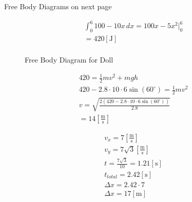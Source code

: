 \documentclass[12pt]{article}
\begin{document}
\begin{center}
  Free Body Diagrams on next page
\end{center}

\begin{equation}
  \begin{split}
    \int_0^6 100-10x\,dx=100x-5x^2\Big|_0^6\\
    =420[\si{\joule}]\\
  \end{split}
  \label{15}
\end{equation}

    \begin{figure}[H]
      \centering
      
      \caption{Free Body Diagram for Doll}
      \label{fig:4}
    \end{figure}

    \begin{equation}
      \begin{split}
        420=\frac{1}{2}mv^2+mgh\\
        420-2.8\cdot10\cdot6\sin(60^{\circ})=\frac{1}{2}mv^2\\
        v=\sqrt{\frac{2(420-2.8\cdot10\cdot6\sin(60^{\circ}))}{2.8}}\\
        =14\left[ \frac{\si{\meter}}{\si{\second}} \right]
      \end{split}
      \label{16}
    \end{equation}

    \begin{equation}
      \begin{split}
        v_x=7\left[ \frac{\si{\meter}}{\si{\second}} \right]\\
        v_y=7\sqrt{3}\left[ \frac{\si{\meter}}{\si{\second}} \right]\\
        t=\frac{7\sqrt{3}}{10}=1.21[\si{\second}]\\
        t_{total}=2.42[\si{\second}]\\
        \Delta x=2.42\cdot7\\
        \Delta x=17[\si{\meter}]\\
      \end{split}
      \label{17}
    \end{equation}

\hline
\end{document}
